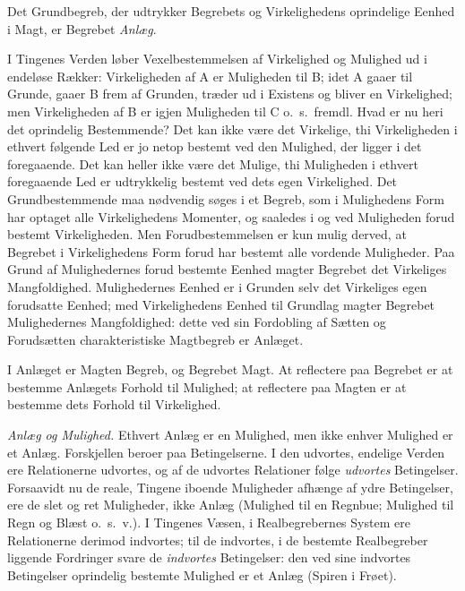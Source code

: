 \documentclass[12pt]{book}
\newcommand{\opage}[1]{\marginnote{\footnotesize\textit{[#1]}}}
\begin{document}
Det Grundbegreb, der udtrykker Begrebets og
Virkelighedens oprindelige Eenhed i Magt, er Begrebet \emph{Anlæg}.

I Tingenes Verden løber Vexelbestemmelsen af
Virkelighed og Mulighed ud i endeløse Rækker: Virkeligheden af
A er Muligheden til B; idet A gaaer til Grunde, gaaer
B frem af Grunden, træder ud i Existens og bliver en
Virkelighed; men Virkeligheden af B er igjen Muligheden
til C o.~s.~fremdl. Hvad er nu heri det oprindelig
Bestemmende? Det kan ikke være det Virkelige, thi
Virkeligheden i ethvert følgende Led er jo netop bestemt ved den
Mulighed, der ligger i det foregaaende. Det kan heller ikke
være det Mulige, thi Muligheden i ethvert foregaaende Led
er udtrykkelig bestemt ved dets egen Virkelighed. Det
Grundbestemmende maa nødvendig søges i et Begreb, som i
Mulighedens Form har optaget alle Virkelighedens Momenter,
og saaledes i og ved Muligheden forud bestemt
Virkeligheden. Men Forudbestemmelsen er kun mulig derved, at
Begrebet i Virkelighedens Form forud har bestemt alle
vordende Muligheder. Paa Grund af Mulighedernes forud
bestemte Eenhed magter Begrebet det Virkeliges
Mangfoldighed. Mulighedernes Eenhed er i Grunden selv det
Virkeliges egen forudsatte Eenhed; med Virkelighedens Eenhed til
Grundlag magter Begrebet Mulighedernes Mangfoldighed:
dette ved sin Fordobling af Sætten og Forudsætten
charakteristiske Magtbegreb er Anlæget.

I Anlæget er Magten Begreb, og Begrebet Magt. At
reflectere paa Begrebet er at bestemme Anlægets Forhold
til Mulighed; at reflectere paa Magten er at bestemme dets
Forhold til Virkelighed.

\emph{Anlæg og Mulighed.} Ethvert Anlæg er en
Mulighed, men ikke enhver Mulighed er et Anlæg. Forskjellen
beroer paa Betingelserne. I den udvortes, endelige Verden
\opage{46} ere Relationerne udvortes, og af de udvortes Relationer
følge \emph{udvortes} Betingelser. Forsaavidt nu de reale,
Tingene iboende Muligheder afhænge af ydre Betingelser, ere de
slet og ret Muligheder, ikke Anlæg (Mulighed til en
Regnbue; Mulighed til Regn og Blæst o.~s.~v.). I Tingenes
Væsen, i Realbegrebernes System ere Relationerne derimod
indvortes; til de indvortes, i de bestemte Realbegreber
liggende Fordringer svare de \emph{indvortes} Betingelser: den ved
sine indvortes Betingelser oprindelig bestemte Mulighed er
et Anlæg (Spiren i Frøet).
\end{document}
